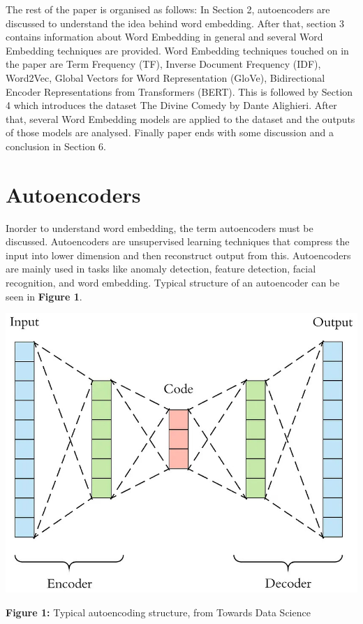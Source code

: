 \documentclass[man]{apa7}
\begin{document}
The rest of the paper is organised as follows: In Section 2, autoencoders are discussed to understand the idea behind word embedding. After that, section 3 contains information about Word Embedding in general and several Word Embedding techniques are provided. Word Embedding techniques touched on in the paper are Term Frequency (TF), Inverse Document Frequency (IDF), Word2Vec, Global Vectors for Word Representation (GloVe), Bidirectional Encoder Representations from Transformers (BERT). This is followed by Section 4 which introduces the dataset The Divine Comedy by Dante Alighieri. After that, several Word Embedding models are applied to the dataset and the outputs of those models are analysed. Finally paper ends with some discussion and a conclusion in Section 6.

\section{Autoencoders}

Inorder to understand word embedding, the term autoencoders must be discussed. Autoencoders are unsupervised learning techniques that compress the input into lower dimension and then reconstruct output from this. Autoencoders are mainly used in tasks like anomaly detection, feature detection, facial recognition, and word embedding. Typical structure of an autoencoder can be seen in \textbf{Figure 1}.\\

\begin{center}

\includegraphics[scale=0.4]{autoencoding.jpg}

\textbf{Figure 1:} Typical autoencoding structure, from Towards Data Science\\[2\baselineskip]

\end{center}
\end{document}
